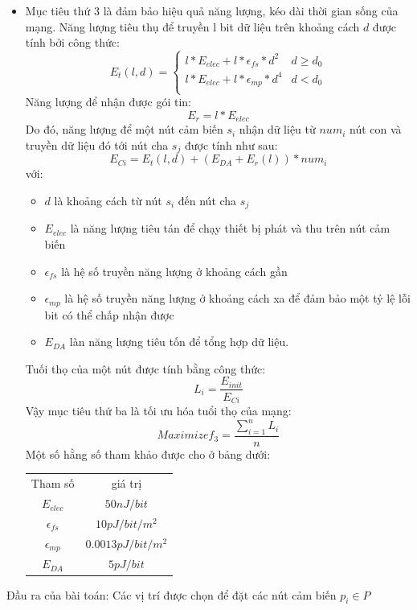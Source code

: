 \documentclass{article}
\begin{document}
\begin{itemize}
    \item Mục tiêu thứ 3 là đảm bảo hiệu quả năng lượng, kéo dài thời gian sống của mạng.
    \newline Năng lượng tiêu thụ để truyền l bit dữ liệu trên khoảng cách $d$ được tính bởi công thức:
    \begin{equation}
        E_t(l, d) = 
        \begin{cases}
            l * E_{elec} + l * \epsilon_{fs} * d^2 & d \geq d_0\\
            l * E_{elec} + l * \epsilon_{mp} * d^4 & d < d_0 \\
        \end{cases}
    \end{equation}
    Năng lượng để nhận được gói tin:
    $$ E_r = l * E_{elec}$$
    Do đó, năng lượng để một nút cảm biến $s_i$ nhận dữ liệu từ $num_i$ nút con và truyền dữ liệu đó tới nút cha $s_j$ được tính như sau:
    $$ E_{Ci} = E_t(l, d) + (E_{DA} + E_r(l))*num_i$$
    với:
    \begin{itemize}
        \item $d$ là khoảng cách từ nút $s_i$ đến nút cha $s_j$
        \item $E_{elec}$ là năng lượng tiêu tán để chạy thiết bị phát và thu trên nút cảm biến
        \item $\epsilon_{fs}$ là hệ số truyền năng lượng ở khoảng cách gần
        \item $\epsilon_{mp}$ là hệ số truyền năng lượng ở khoảng cách xa để đảm bảo một tỷ lệ lỗi bit có thể chấp nhận được
        \item $E_{DA}$ làn năng lượng tiêu tốn để tổng hợp dữ liệu.
    \end{itemize}
    Tuối thọ của một nút được tính bằng công thức:
    $$ L_i = \frac{E_{init}}{E_{Ci}}$$
    Vậy mục tiêu thứ ba là tối ưu hóa tuổi thọ của mạng:
    $$ Maximize f_3 = \frac{\sum_{i=1}^n L_i}{n} $$
    Một số hằng số tham khảo được cho ở bảng dưới:
    \begin{center}
    \begin{tabular}{ |c|c| } 
     \hline
     Tham số & giá trị  \\ 
     $E_{elec}$ & $50nJ/bit$  \\ 
     $\epsilon_{fs}$ & $10pJ/bit/m^2$  \\
     $\epsilon_{mp}$ & $0.0013pJ/bit/m^2$  \\
     $E_{DA}$ & $5pJ/bit$   \\
     \hline
    \end{tabular}
    \end{center}
\end{itemize}
Đầu ra của bài toán: Các vị trí được chọn để đặt các nút cảm biến $p_i \in P$
\end{document}
